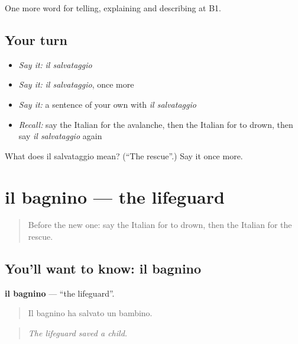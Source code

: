 \begin{grammarlens}[title={What you've built}]
One more word for telling, explaining and describing at B1.
\end{grammarlens}

\subsection*{Your turn}
\begin{itemize}
\raggedright
  \item \emph{Say it:} \emph{il salvataggio}
  \item \emph{Say it:} \emph{il salvataggio}, once more
  \item \emph{Say it:} a sentence of your own with \emph{il salvataggio}
  \item \emph{Recall:} say the Italian for the avalanche, then the Italian for to drown, then say \emph{il salvataggio} again
\end{itemize}

\begin{tcolorbox}[breakable,colback=teal!4,colframe=teal!35!black,title={Before you move on}]
What does il salvataggio mean? (\textquotedblleft{}The rescue\textquotedblright{}.) Say it once more.
\end{tcolorbox}
\section[il bagnino]{il bagnino — the lifeguard}

\label{lesson:IT-C306-bagnino}



\begin{quote}
Before the new one: say the Italian for to drown, then the Italian for the rescue.
\end{quote}

\subsection*{You'll want to know: il bagnino}
\textbf{il bagnino} — \textquotedblleft{}the lifeguard\textquotedblright{}.

\begin{quote}
Il bagnino ha salvato un bambino.
\end{quote}

\begin{quote}
\emph{The lifeguard saved a child.}
\end{quote}

